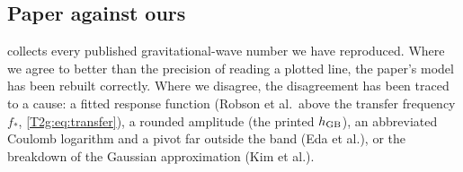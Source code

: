 \subsection{Paper against ours}
\label{10b:sec:paper-vs-ours}

 collects every published gravitational-wave number we have reproduced. Where we
agree to better than the precision of reading a plotted line, the paper's model has been rebuilt correctly. Where we
disagree, the disagreement has been traced to a cause: a fitted response function (Robson et al.\ above the transfer frequency $f_*$, \cref{T2g:eq:transfer}), a
rounded amplitude (the printed $h_{\rm GB}$), an abbreviated Coulomb logarithm and a pivot far outside the band (Eda et
al.), or the breakdown of the Gaussian approximation (Kim et al.).

